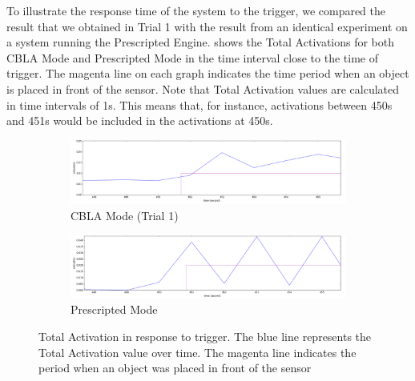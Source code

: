 \FloatBarrier

To illustrate the response time of the system to the trigger, we compared the result that we obtained in Trial 1 with the result from an identical experiment on a system running the Prescripted Engine.  shows the Total Activations for both CBLA Mode and Prescripted Mode in the time interval close to the time of trigger. The magenta line on each graph indicates the time period when an object is placed in front of the sensor. Note that Total Activation values are calculated in time intervals of 1s. This means that, for instance, activations between 450s and 451s would be included in the activations at 450s. 

\begin{figure}[!htbp]
	\centering
	\begin{subfigure}[t]{0.8\textwidth}
		\centering
		\includegraphics[width=1.0 \textwidth]{"fig/validations/CBLA_responsiveness_c"}
		\caption{CBLA Mode (Trial 1)}
		\label{fig:response_plot_cbla}
	\end{subfigure}
	
	\begin{subfigure}[t]{0.8\textwidth}
		\centering
		\includegraphics[width=1.0 \textwidth]{"fig/validations/Prescripted_responsiveness_c"}
		\caption{Prescripted Mode}
		\label{fig:response_plot_prescripted}
	\end{subfigure}
	\caption[Total Activation in response to trigger plots]{Total Activation in response to trigger. The blue line represents the Total Activation value over time. The magenta line indicates the period when an object was placed in front of the sensor}
	\label{fig:Response_to_trigger_plot}
\end{figure}

